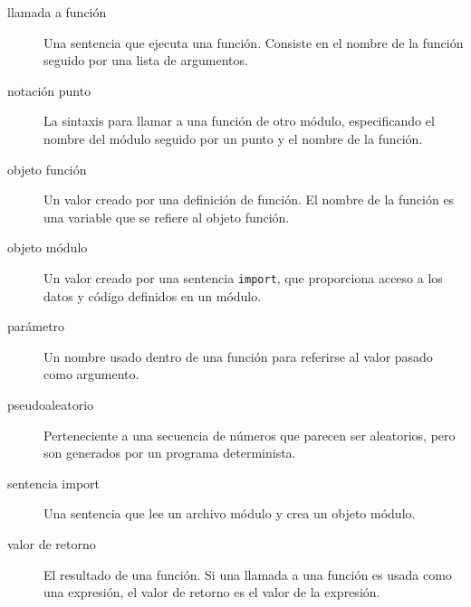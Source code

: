 
\begin{description}
\item[llamada a función]
Una sentencia que ejecuta una función. Consiste en el nombre de la
función seguido por una lista de argumentos.
\end{description}


\begin{description}
\item[notación punto]
La sintaxis para llamar a una función de otro módulo, especificando el
nombre del módulo seguido por un punto y el nombre de la función.
\end{description}


\begin{description}
\item[objeto función]
Un valor creado por una definición de función. El nombre de la función
es una variable que se refiere al objeto función.
\end{description}


\begin{description}
\item[objeto módulo]
Un valor creado por una sentencia \texttt{import}, que proporciona
acceso a los datos y código definidos en un módulo.
\end{description}


\begin{description}
\item[parámetro]
Un nombre usado dentro de una función para referirse al valor pasado
como argumento.
\end{description}


\begin{description}
\item[pseudoaleatorio]
Perteneciente a una secuencia de números que parecen ser aleatorios,
pero son generados por un programa determinista.
\end{description}


\begin{description}
\item[sentencia import]
Una sentencia que lee un archivo módulo y crea un objeto módulo.
\end{description}

 

\begin{description}
\item[valor de retorno]
El resultado de una función. Si una llamada a una función es usada como
una expresión, el valor de retorno es el valor de la expresión.
\end{description}


